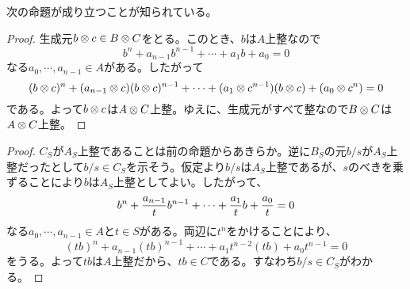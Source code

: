 


\begin{rem}
  次の命題が成り立つことが知られている。
\end{rem}

\begin{proof}
  生成元$b \otimes c \in B \otimes C$をとる。このとき、$b$は$A$上整なので
  \[
  b^n + a_{n-1} b^{n-1} + \cdots + a_{1} b + a_0 = 0
  \]
  なる$a_0 , \cdots , a_{n-1} \in A$がある。したがって
  \[
  (b \otimes c)^n + (a_{n-1} \otimes c)(b \otimes c)^{n-1} + \cdots + (a_1 \otimes c^{n-1}) (b \otimes c) + (a_0 \otimes c^n) = 0
  \]
  である。よって$b \otimes c$は$A \otimes C$上整。ゆえに、生成元がすべて整なので$B \otimes C$は$A \otimes C$上整。
\end{proof}


\begin{proof}
  $C_S$が$A_S$上整であることは前の命題からあきらか。逆に$B_S$の元$b/s$が$A_S$上整だったとして$b/s \in C_S$を示そう。仮定より$b/s$は$A_S$上整であるが、$s$のべきを乗ずることにより$b$は$A_S$上整としてよい。したがって、
  \[
  b^n + \frac{a_{n-1}}{t} b^{n-1}  + \cdots + \frac{a_1}{t} b + \frac{a_0}{t} = 0
  \]
  なる$a_0 , \cdots , a_{n-1} \in A$と$t \in S$がある。両辺に$t^n$をかけることにより、
  \[
    (tb)^n + a_{n-1} (tb)^{n-1}  + \cdots + a_1 t^{n-2} (tb) + a_0 t^{n-1} = 0
  \]
  をうる。よって$tb$は$A$上整だから、$tb \in C$である。すなわち$b/s \in C_S$がわかる。
\end{proof}



